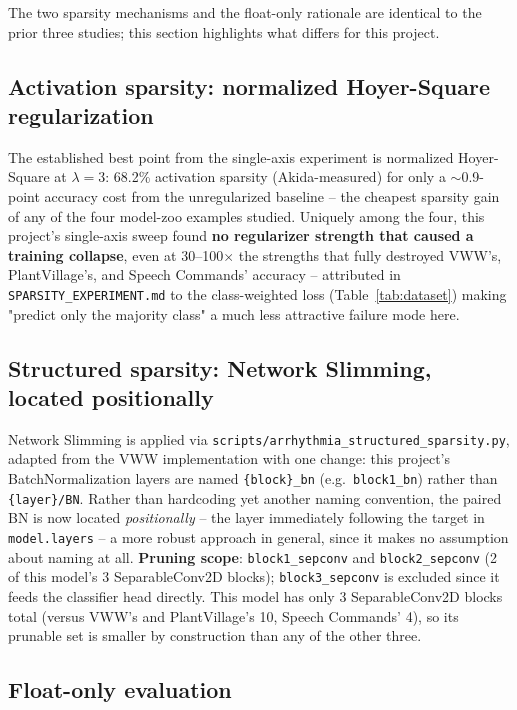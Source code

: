 \documentclass[11pt]{article}
\newcommand{\code}[1]{\texttt{#1}}
\begin{document}
The two sparsity mechanisms and the float-only rationale are identical to the prior three studies; this section highlights what differs for this project.

\subsection{Activation sparsity: normalized Hoyer-Square regularization}

The established best point from the single-axis experiment is normalized Hoyer-Square at $\lambda=3$: 68.2\% activation sparsity (Akida-measured) for only a $\sim$0.9-point accuracy cost from the unregularized baseline -- the cheapest sparsity gain of any of the four model-zoo examples studied. Uniquely among the four, this project's single-axis sweep found \textbf{no regularizer strength that caused a training collapse}, even at 30--100$\times$ the strengths that fully destroyed VWW's, PlantVillage's, and Speech Commands' accuracy -- attributed in \code{SPARSITY\_EXPERIMENT.md} to the class-weighted loss (Table~\ref{tab:dataset}) making "predict only the majority class" a much less attractive failure mode here.

\subsection{Structured sparsity: Network Slimming, located positionally}
\label{sec:structured}

Network Slimming \cite{networkslimming} is applied via \code{scripts/arrhythmia\_structured\_sparsity.py}, adapted from the VWW implementation with one change: this project's BatchNormalization layers are named \code{\{block\}\_bn} (e.g.\ \code{block1\_bn}) rather than \code{\{layer\}/BN}. Rather than hardcoding yet another naming convention, the paired BN is now located \emph{positionally} -- the layer immediately following the target in \code{model.layers} -- a more robust approach in general, since it makes no assumption about naming at all. \textbf{Pruning scope}: \code{block1\_sepconv} and \code{block2\_sepconv} (2 of this model's 3 SeparableConv2D blocks); \code{block3\_sepconv} is excluded since it feeds the classifier head directly. This model has only 3 SeparableConv2D blocks total (versus VWW's and PlantVillage's 10, Speech Commands' 4), so its prunable set is smaller by construction than any of the other three.

\subsection{Float-only evaluation}
\end{document}
